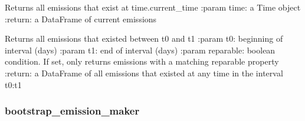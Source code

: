 \documentclass[letterpaper,10pt,english]{sphinxmanual}
\begin{document}
\begin{fulllineitems}
\begin{fulllineitems}
\label{\detokenize{index:feast.EmissionSimModules.emission_class_functions.Emission.get_current_emissions}}
Returns all emissions that exist at time.current\_time
:param time: a Time object
:return: a DataFrame of current emissions

\end{fulllineitems}


\begin{fulllineitems}
\label{\detokenize{index:feast.EmissionSimModules.emission_class_functions.Emission.get_emissions_in_range}}
Returns all emissions that existed between t0 and t1
:param t0: beginning of interval (days)
:param t1: end of interval (days)
:param reparable: boolean condition. If set, only returns emissions with a matching reparable property
:return: a DataFrame of all emissions that existed at any time in the interval t0:t1

\end{fulllineitems}


\end{fulllineitems}



\subsubsection{bootstrap\_emission\_maker}
\label{\detokenize{index:bootstrap-emission-maker}}
\end{document}
